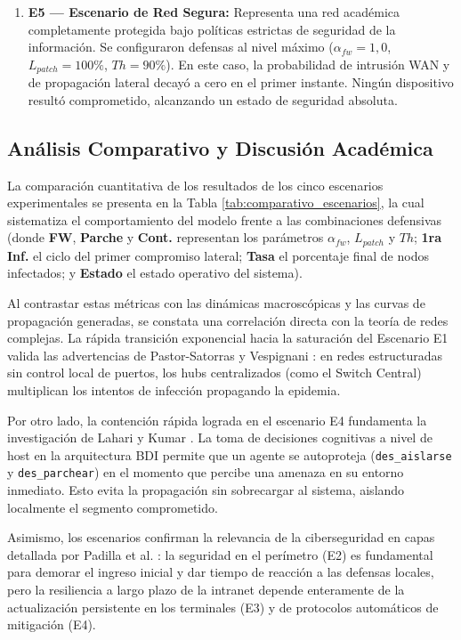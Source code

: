\begin{enumerate}
    \item \textbf{E5 — Escenario de Red Segura:} Representa una red académica completamente protegida bajo políticas estrictas de seguridad de la información. Se configuraron defensas al nivel máximo ($\alpha_{fw} = 1,0$, $L_{patch} = 100\%$, $Th = 90\%$). En este caso, la probabilidad de intrusión WAN y de propagación lateral decayó a cero en el primer instante. Ningún dispositivo resultó comprometido, alcanzando un estado de seguridad absoluta.
\end{enumerate}

\subsection{Análisis Comparativo y Discusión Académica}
La comparación cuantitativa de los resultados de los cinco escenarios experimentales se presenta en la Tabla \ref{tab:comparativo_escenarios}, la cual sistematiza el comportamiento del modelo frente a las combinaciones defensivas (donde \textbf{FW}, \textbf{Parche} y \textbf{Cont.} representan los parámetros $\alpha_{fw}$, $L_{patch}$ y $Th$; \textbf{1ra Inf.} el ciclo del primer compromiso lateral; \textbf{Tasa} el porcentaje final de nodos infectados; y \textbf{Estado} el estado operativo del sistema).

Al contrastar estas métricas con las dinámicas macroscópicas y las curvas de propagación generadas, se constata una correlación directa con la teoría de redes complejas. La rápida transición exponencial hacia la saturación del Escenario E1 valida las advertencias de Pastor-Satorras y Vespignani \cite{pastorsatorras2001epidemic}: en redes estructuradas sin control local de puertos, los hubs centralizados (como el Switch Central) multiplican los intentos de infección propagando la epidemia. 

Por otro lado, la contención rápida lograda en el escenario E4 fundamenta la investigación de Lahari y Kumar \cite{lahari2025optimal}. La toma de decisiones cognitivas a nivel de host en la arquitectura BDI permite que un agente se autoproteja (\texttt{des\_aislarse} y \texttt{des\_parchear}) en el momento que percibe una amenaza en su entorno inmediato. Esto evita la propagación sin sobrecargar al sistema, aislando localmente el segmento comprometido. 

Asimismo, los escenarios confirman la relevancia de la ciberseguridad en capas detallada por Padilla et al. \cite{padilla2025serdux}: la seguridad en el perímetro (E2) es fundamental para demorar el ingreso inicial y dar tiempo de reacción a las defensas locales, pero la resiliencia a largo plazo de la intranet depende enteramente de la actualización persistente en los terminales (E3) y de protocolos automáticos de mitigación (E4).

